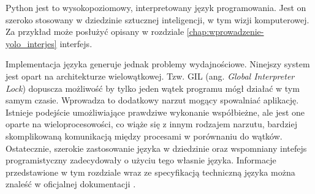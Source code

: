 Python jest to wysokopoziomowy, interpretowany język programowania. Jest on szeroko stosowany w dziedzinie sztucznej inteligencji, w tym wizji komputerowej. Za przykład może posłużyć opisany w rozdziale \ref{chap:wprowadzenie-yolo_interjes} interfejs. 

Implementacja języka generuje jednak problemy wydajnościowe. Ninejszy system jest opart na architekturze wielowątkowej. Tzw. GIL (ang. \emph{Global Interpreter Lock}) dopuscza możliwość by tylko jeden wątek programu mógł działać w tym samym czasie. Wprowadza to dodatkowy narzut mogący spowalniać aplikację. Istnieje podejście umożliwiające prawdziwe wykonanie współbieżne, ale jest one oparte na wieloprocesowości, co wiąże się z innym rodzajem narzutu, bardziej skomplikowaną komunikacją między procesami w porównaniu do wątków. Ostatecznie, szerokie zastosowanie języka w dziedzinie oraz wspomniany intefejs programistyczny zadecydowały o użyciu tego własnie języka. Informacje przedstawione w tym rozdziale wraz ze specyfikacją techniczną języka można znaleść w oficjalnej dokumentacji \cite{Python_docs}. 
